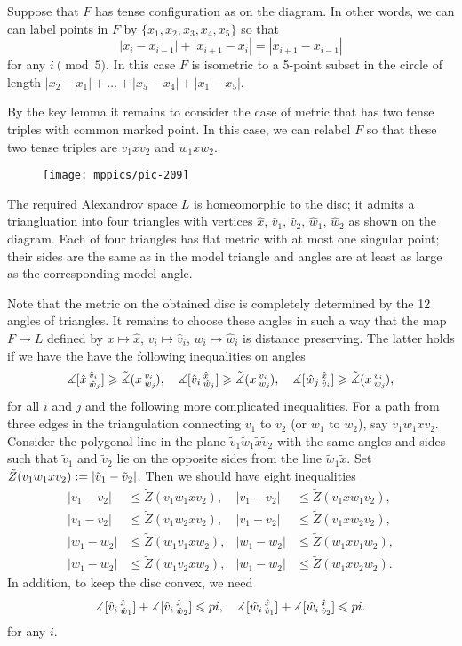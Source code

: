 \documentclass{article}
\begin{document}
Suppose that $F$ has tense configuration as on the diagram.
In other words, we can can label points in $F$  by $\{x_1,x_2,x_3,x_4,x_5\}$ so that
\[|x_{i}-x_{i-1}|+|x_{i+1}-x_{i}|=|x_{i+1}-x_{i-1}|\]
for any $i\pmod 5$.
In this case $F$ is isometric to a 5-point subset in the circle of length $|x_2-x_1|+\dots+|x_5-x_4|+|x_1-x_5|$.

By the key lemma it remains to consider the case of metric that has two tense triples with common marked point.
In this case, we can relabel $F$ so that these two tense triples are $v_1xv_2$ and $w_1xw_2$.

\begin{wrapfigure}{r}{25mm}
\vskip-4mm
\centering
\texttt{[image: mppics/pic-209]}
\end{wrapfigure}

The required Alexandrov space $L$ is homeomorphic to the disc;
it admits a triangluation into four triangles with vertices $\hat x$, $\hat v_1$, $\hat v_2$, $\hat w_1$, $\hat w_2$ as shown on the diagram.
Each of four triangles has flat metric with at most one singular point;
their sides are the same as in the model triangle and angles are at least as large as the corresponding model angle.

Note that the metric on the obtained disc is completely determined by the 12 angles of triangles.
It remains to choose these angles in such a way that the map $F\to L$ defined by $x\mapsto \hat x$, $v_i\mapsto \hat v_i$, $w_i\mapsto \hat w_i$ is distance preserving.
The latter holds if we have the have the following inequalities on angles
\[
\measuredangle [\hat x\,{}^{\hat v_i}_{\hat w_j}]\geqslant \tilde\measuredangle(x\,{}^{v_i}_{w_j}\hspace{-0.2ex}), 
\quad
\measuredangle [\hat v_i\,{}^{\hat x}_{\hat w_j}]\geqslant \tilde\measuredangle(x\,{}^{v_i}_{w_j}\hspace{-0.2ex}),
\quad
\measuredangle [\hat w_j\,{}^{\hat x}_{\hat v_i}]\geqslant \tilde\measuredangle(x\,{}^{v_i}_{w_j}\hspace{-0.2ex}),
\]
for all $i$ and $j$ and the following more complicated inequalities.
For a path from three edges in the triangulation connecting $v_1$ to $v_2$ (or $w_1$ to $w_2$), say $v_1w_1xv_2$.
Consider the polygonal line in the plane $\tilde v_1\tilde w_1\tilde x\tilde v_2$ with the same angles and sides such that $\tilde v_1$ and $\tilde v_2$ lie on the opposite sides from the line $\tilde w_1\tilde x$.
Set $\tilde Z(v_1w_1xv_2)\mathrel{:=} |\tilde v_1-\tilde v_2|$.
Then we should have eight inequalities
\begin{align*}
|v_1- v_2|&\le \tilde Z(v_1w_1xv_2),
&
|v_1- v_2|&\le \tilde Z(v_1xw_1v_2),
\\
|v_1- v_2|&\le \tilde Z(v_1w_2xv_2),
&
|v_1- v_2|&\le \tilde Z(v_1xw_2v_2),
\\
|w_1- w_2|&\le \tilde Z(w_1v_1xw_2),
&
|w_1- w_2|&\le \tilde Z(w_1xv_1w_2),
\\
|w_1- w_2|&\le \tilde Z(w_1v_2xw_2),
&
|w_1- w_2|&\le \tilde Z(w_1xv_2w_2).
\end{align*}
In addition, to keep the disc convex, we need
\[
\measuredangle [\hat v_i\,{}^{\hat x}_{\hat w_1}]
+\measuredangle [\hat v_i\,{}^{\hat x}_{\hat w_2}]
\leqslant pi,
\quad
\measuredangle [\hat w_i\,{}^{\hat x}_{\hat v_1}]
+\measuredangle [\hat w_i\,{}^{\hat x}_{\hat v_2}]
\leqslant pi.
\]
for any $i$.
\qeds
\end{document}
